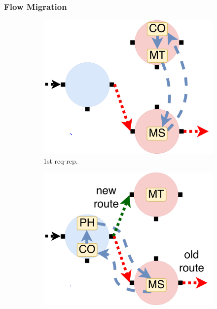 \subsubsection{Flow Migration}

\begin{figure}[!h]
\begin{subfigure}[t]{0.33\linewidth}
   \centering
   \includegraphics[width=\columnwidth]{figure/nfactor-mig1.pdf}
   \caption{1st req-rep.}\label{fig:mig1}
  \end{subfigure}\hfill
  \begin{subfigure}[t]{0.33\linewidth}
     \centering
     \includegraphics[width=\columnwidth]{figure/nfactor-mig2.pdf}

\end{subfigure}
\end{figure}
